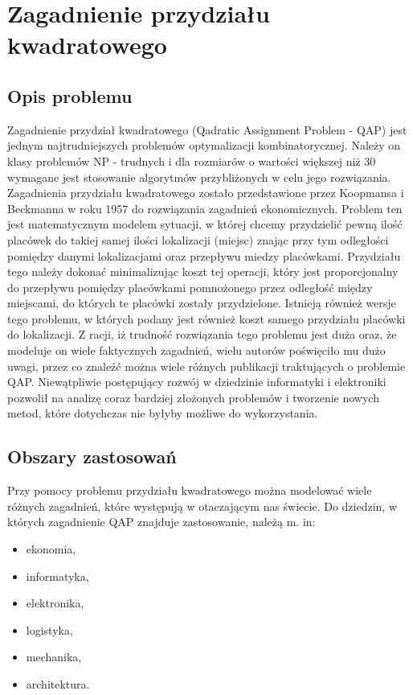 \chapter{Zagadnienie przydziału kwadratowego}
\label{cha:qap}

\section{Opis problemu}
\label{sec:opis}
Zagadnienie przydział kwadratowego (Qadratic Assignment Problem - QAP) jest jednym najtrudniejszych problemów optymalizacji kombinatorycznej. Należy on klasy problemów NP - trudnych i dla rozmiarów o wartości większej niż 30 wymagane jest stosowanie algorytmów przybliżonych w celu jego rozwiązania. Zagadnienia przydziału kwadratowego zostało przedstawione przez Koopmansa i Beckmanna w roku 1957 do rozwiązania zagadnień ekonomicznych. Problem ten jest matematycznym modelem sytuacji, w której chcemy przydzielić pewną ilość placówek do takiej samej ilości lokalizacji (miejsc) znając przy tym odległości pomiędzy danymi lokalizacjami oraz przepływu miedzy placówkami. Przydziału tego należy dokonać minimalizując koszt tej operacji, który jest proporcjonalny do przepływu pomiędzy placówkami pomnożonego przez odległość między miejscami, do których te placówki zostały przydzielone. Istnieją również wersje tego problemu, w których podany jest również koszt samego przydziału placówki do lokalizacji. Z racji, iż trudność rozwiązania tego problemu jest duża oraz, że modeluje on wiele faktycznych zagadnień, wielu autorów poświęciło mu dużo uwagi, przez co znaleźć można wiele różnych publikacji traktujących o problemie QAP. Niewątpliwie postępujący rozwój w dziedzinie informatyki i elektroniki pozwolił na analizę coraz bardziej złożonych problemów i tworzenie nowych metod, które dotychczas nie byłyby możliwe do wykorzystania. 

\section{Obszary zastosowań}
\label{sec:zastosowanie}
Przy pomocy problemu przydziału kwadratowego można modelować wiele różnych zagadnień, które występują w otaczającym nas świecie. Do dziedzin, w których zagadnienie QAP znajduje zastosowanie, należą m. in:
\begin{itemize}
\item ekonomia,
\item informatyka,
\item elektronika,
\item logistyka,
\item mechanika,
\item architektura.
\end{itemize}

